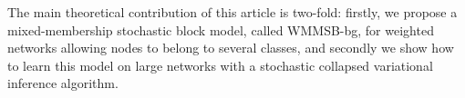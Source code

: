 The main theoretical contribution of this article is two-fold: firstly, we propose a mixed-membership stochastic block model, called WMMSB-bg, for weighted networks allowing nodes to belong to several classes, and secondly we show how to learn this model on large networks with a stochastic collapsed variational inference algorithm.

%
%
%
%
%
%
%

